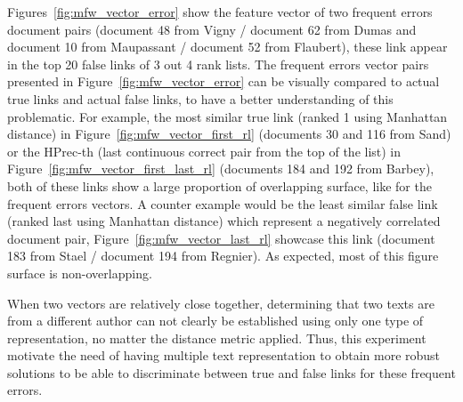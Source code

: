 Figures~\ref{fig:mfw_vector_error} show the feature vector of two frequent errors document pairs (document 48 from Vigny / document 62 from Dumas and document 10 from Maupassant / document 52 from Flaubert), these link appear in the top 20 false links of 3 out 4 rank lists.
The frequent errors vector pairs presented in Figure~\ref{fig:mfw_vector_error} can be visually compared to actual true links and actual false links, to have a better understanding of this problematic.
For example, the most similar true link (ranked 1 using Manhattan distance) in Figure~\ref{fig:mfw_vector_first_rl} (documents 30 and 116 from Sand) or the HPrec-th (last continuous correct pair from the top of the list) in Figure~\ref{fig:mfw_vector_first_last_rl} (documents 184 and 192 from Barbey), both of these links show a large proportion of overlapping surface, like for the frequent errors vectors.
A counter example would be the least similar false link (ranked last using Manhattan distance) which represent a negatively correlated document pair, Figure~\ref{fig:mfw_vector_last_rl} showcase this link (document 183 from Stael / document 194 from Regnier).
As expected, most of this figure surface is non-overlapping.

When two vectors are relatively close together, determining that two texts are from a different author can not clearly be established using only one type of representation, no matter the distance metric applied.
Thus, this experiment motivate the need of having multiple text representation to obtain more robust solutions to be able to discriminate between true and false links for these frequent errors.

